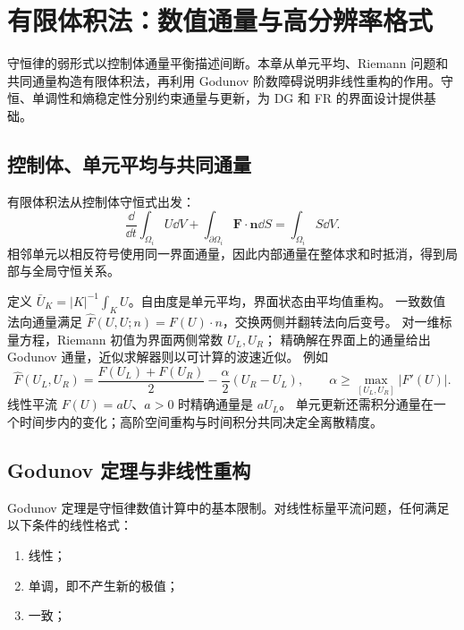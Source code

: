 \chapter{有限体积法：数值通量与高分辨率格式}\label{ch:8}
\begin{chaptersummary}
守恒律的弱形式以控制体通量平衡描述间断。本章从单元平均、Riemann 问题和共同通量构造有限体积法，再利用 Godunov 阶数障碍说明非线性重构的作用。守恒、单调性和熵稳定性分别约束通量与更新，为 DG 和 FR 的界面设计提供基础。
\end{chaptersummary}
\section{控制体、单元平均与共同通量}
有限体积法从控制体守恒式出发：
\[
\frac{\dd}{\dd t}
\int_{\Omega_i}U\dd V
+
\int_{\partial\Omega_i}
\bm F\cdot\bm n\dd S
=
\int_{\Omega_i}S\dd V.
\]
相邻单元以相反符号使用同一界面通量，因此内部通量在整体求和时抵消，得到局部与全局守恒关系。


定义 $\bar U_K=|K|^{-1}\int_KU$。自由度是单元平均，界面状态由平均值重构。
一致数值法向通量满足 $\widehat F(U,U;n)=F(U)\cdot n$，交换两侧并翻转法向后变号。
对一维标量方程，Riemann 初值为界面两侧常数 $U_L,U_R$；
精确解在界面上的通量给出 Godunov 通量，近似求解器则以可计算的波速近似。
例如
\[
\widehat F(U_L,U_R)=\frac{F(U_L)+F(U_R)}2-\frac{\alpha}2(U_R-U_L),
\qquad
\alpha\ge\max_{[U_L,U_R]}|F'(U)|.
\]
线性平流 $F(U)=aU$、$a>0$ 时精确通量是 $aU_L$。
单元更新还需积分通量在一个时间步内的变化；高阶空间重构与时间积分共同决定全离散精度。

\section{Godunov 定理与非线性重构}
Godunov 定理是守恒律数值计算中的基本限制。对线性标量平流问题，任何满足以下条件的线性格式：

\begin{enumerate}
  \item 线性；
  \item 单调，即不产生新的极值；
  \item 一致；
\end{enumerate}


